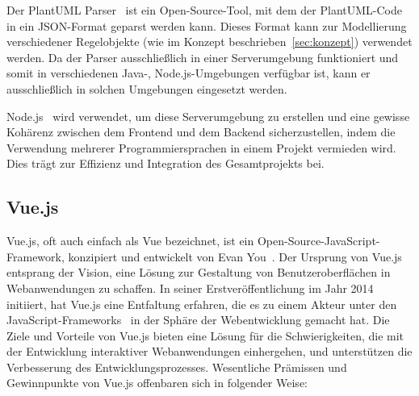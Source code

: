 Der PlantUML Parser~\cite{plantUMLParser} ist ein Open-Source-Tool,
mit dem der PlantUML-Code in ein JSON-Format geparst werden kann. Dieses Format kann zur Modellierung verschiedener
Regelobjekte (wie im Konzept beschrieben~\ref{sec:konzept}) verwendet werden. Da der Parser ausschließlich in einer
Serverumgebung funktioniert und somit in verschiedenen Java-, Node.js-Umgebungen verfügbar ist, kann er
ausschließlich in solchen Umgebungen eingesetzt werden.

Node.js~\cite{Node} wird verwendet, um diese Serverumgebung zu erstellen und eine gewisse Kohärenz zwischen dem
Frontend und dem Backend sicherzustellen, indem die Verwendung mehrerer Programmiersprachen in einem Projekt vermieden
wird. Dies trägt zur Effizienz und Integration des Gesamtprojekts bei.

\subsection{Vue.js}

Vue.js, oft auch einfach als Vue bezeichnet, ist ein  Open-Source-JavaScript-Framework, konzipiert und
entwickelt von Evan You~\cite{vue}. Der Ursprung von Vue.js entsprang der Vision, eine Lösung zur Gestaltung von
Benutzeroberflächen in Webanwendungen zu schaffen. In seiner Erstveröffentlichung im Jahr 2014 initiiert, hat Vue.js
eine Entfaltung erfahren, die es zu einem Akteur unter den JavaScript-Frameworks~\cite{levlin2020dom} in der
Sphäre der Webentwicklung gemacht hat. Die Ziele und Vorteile von Vue.js bieten eine Lösung für die Schwierigkeiten, die
mit der Entwicklung interaktiver Webanwendungen einhergehen, und unterstützen die Verbesserung des Entwicklungsprozesses.
Wesentliche Prämissen und Gewinnpunkte von Vue.js offenbaren sich in folgender Weise:

